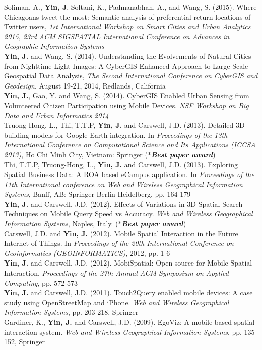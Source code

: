 \documentclass[11pt, a4paper]{article}
\newcommand{\years}[1]{\marginnote{\scriptsize #1}}
\begin{document}
\years{2015}Soliman, A., \textbf{Yin, J}, Soltani, K., Padmanabhan, A., and Wang, S. (2015). Where Chicagoans tweet the most: Semantic analysis of preferential return locations of Twitter users, \textit{1st International Workshop on Smart Cities and Urban Analytics 2015, 23rd ACM SIGSPATIAL International Conference on Advances in Geographic Information Systems}\\ 
\years{2014}\textbf{Yin, J.} and Wang, S. (2014). Understanding the Evolvements of Natural Cities from Nighttime Light Images: A CyberGIS-Enhanced Approach to Large Scale Geospatial Data Analysis, \textit{The Second International Conference on CyberGIS and Geodesign}, August 19-21, 2014, Redlands, California\\
\years{2014}\textbf{Yin, J.}, Gao, Y. and Wang, S. (2014). CyberGIS Enabled Urban Sensing from Volunteered Citizen Participation using Mobile Devices. \textit{NSF Workshop on Big Data and Urban Informatics 2014}\\
\years{2013}Truong-Hong, L., Thi, T.T.P, \textbf{Yin, J.} and Carswell, J.D. (2013). Detailed 3D building models for Google Earth integration. In \textit{Proceedings of the 13th International Conference on Computational Science and Its Applications (ICCSA 2013)}, Ho Chi Minh City, Vietnam: Springer (\textbf{\emph{$*$Best paper award}})\\
\years{2013}Thi, T.T.P, Truong-Hong, L., \textbf{Yin, J.} and Carswell, J.D. (2013). Exploring Spatial Business Data: A ROA based eCampus application. In \textit{Proceedings of the 11th International conference on Web and Wireless Geographical Information Systems}, Banff, AB: Springer Berlin Heidelberg, pp. 164-179\\
\years{2012}\textbf{Yin, J.} and Carswell, J.D. (2012). Effects of Variations in 3D Spatial Search Techniques on Mobile Query Speed vs Accuracy. \textit{Web and Wireless Geographical Information Systems}, Naples, Italy. (\textbf{\emph{$*$Best paper award}})\\
\years{2012}Carswell, J.D. and \textbf{Yin, J.} (2012). Mobile Spatial Interaction in the Future Internet of Things. In \textit{Proceedings of the 20th International Conference on Geoinformatics (GEOINFORMATICS)}, 2012, pp. 1-6\\
\years{2012}\textbf{Yin, J.} and Carswell, J.D. (2012). MobiSpatial: Open-source for Mobile Spatial Interaction. \textit{Proceedings of the 27th Annual ACM Symposium on Applied Computing}, pp. 572-573\\
\years{2012}\textbf{Yin, J.} and Carswell, J.D. (2011). Touch2Query enabled mobile devices: A case study using OpenStreetMap and iPhone. \textit{Web and Wireless Geographical Information Systems}, pp. 203-218, Springer\\
\years{2009} Gardiner, K., \textbf{Yin, J.} and Carswell, J.D. (2009). EgoViz: A mobile based spatial interaction system. \textit{Web and Wireless Geographical Information Systems}, pp. 135-152, Springer
\end{document}
